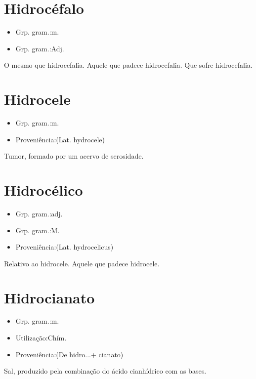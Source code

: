 \documentclass{article}
\begin{document}
\section{Hidrocéfalo}
\begin{itemize}
\item {Grp. gram.:m.}
\end{itemize}
\begin{itemize}
\item {Grp. gram.:Adj.}
\end{itemize}
O mesmo que \textunderscore hidrocefalia\textunderscore .
Aquele que padece hidrocefalia.
Que sofre hidrocefalia.
\section{Hidrocele}
\begin{itemize}
\item {Grp. gram.:m.}
\end{itemize}
\begin{itemize}
\item {Proveniência:(Lat. \textunderscore hydrocele\textunderscore )}
\end{itemize}
Tumor, formado por um acervo de serosidade.
\section{Hidrocélico}
\begin{itemize}
\item {Grp. gram.:adj.}
\end{itemize}
\begin{itemize}
\item {Grp. gram.:M.}
\end{itemize}
\begin{itemize}
\item {Proveniência:(Lat. \textunderscore hydrocelicus\textunderscore )}
\end{itemize}
Relativo ao hidrocele.
Aquele que padece hidrocele.
\section{Hidrocianato}
\begin{itemize}
\item {Grp. gram.:m.}
\end{itemize}
\begin{itemize}
\item {Utilização:Chím.}
\end{itemize}
\begin{itemize}
\item {Proveniência:(De \textunderscore hidro...\textunderscore  + \textunderscore cianato\textunderscore )}
\end{itemize}
Sal, produzido pela combinação do ácido cianhídrico com as bases.
\end{document}
